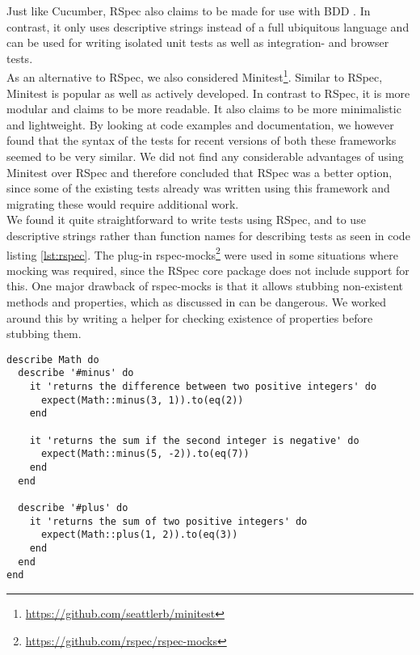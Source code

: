 
Just like Cucumber, RSpec also claims to be made for use with
BDD \cite{web:rspec}. In contrast, it only uses descriptive strings
instead of a full ubiquitous language and can be used for writing
isolated unit tests as well as integration- and browser tests.\\

As an alternative to RSpec, we also considered
Minitest\footnote{\url{https://github.com/seattlerb/minitest}}. Similar
to RSpec, Minitest is popular as well as actively developed. In contrast
to RSpec, it is more modular and claims to be more readable. It also
claims to be more minimalistic and lightweight. By looking at code
examples and documentation, we however found that the syntax of the
tests for recent versions of both these frameworks seemed to be very
similar. We did not find any considerable advantages of using Minitest
over RSpec and therefore concluded that RSpec was a better option, since
some of the existing tests already was written using this framework and
migrating these would require additional work.\\

We found it quite straightforward to write tests using RSpec, and to use
descriptive strings rather than function names for describing tests as
seen in code listing \ref{lst:rspec}. The plug-in rspec-mocks\footnote{\url{https://github.com/rspec/rspec-mocks}}
were used in
some situations where mocking was required, since the RSpec core package does
not include support for this. One major drawback of rspec-mocks is that
it allows stubbing non-existent methods and properties, which as
discussed in  can be dangerous. We worked around
this by writing a helper for checking existence of properties before
stubbing them.\\

\begin{lstlisting}[caption=Example of RSpec tests for a module.,
                   label=lst:rspec, float=t]
describe Math do
  describe '#minus' do
    it 'returns the difference between two positive integers' do
      expect(Math::minus(3, 1)).to(eq(2))
    end

    it 'returns the sum if the second integer is negative' do
      expect(Math::minus(5, -2)).to(eq(7))
    end
  end

  describe '#plus' do
    it 'returns the sum of two positive integers' do
      expect(Math::plus(1, 2)).to(eq(3))
    end
  end
end
\end{lstlisting}
